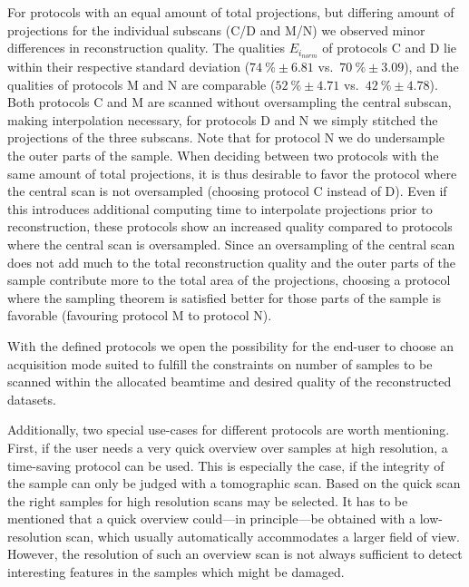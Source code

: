 For protocols with an equal amount of total projections, but differing amount of projections for the individual subscans (C/D and M/N) we observed minor differences in reconstruction quality. The qualities $E_{i_{norm}}$ of protocols C and D lie within their respective standard deviation ($\SI{74}{\percent}\pm6.81$ vs.\ $\SI{70}{\percent}\pm3.09$), and the qualities of protocols M and N are comparable ($\SI{52}{\percent}\pm4.71$ vs.\ $\SI{42}{\percent}\pm4.78$). Both protocols C and M are scanned without oversampling the central subscan, making interpolation necessary, for protocols D and N we simply stitched the projections of the three subscans. Note that for protocol N we do undersample the outer parts of the sample. When deciding between two protocols with the same amount of total projections, it is thus desirable to favor the protocol where the central scan is not oversampled (\ie choosing protocol C instead of D). Even if this introduces additional computing time to interpolate projections prior to reconstruction, these protocols show an increased quality compared to protocols where the central scan is oversampled. Since an oversampling of the central scan does not add much to the total reconstruction quality and the outer parts of the sample contribute more to the total area of the projections, choosing a protocol where the sampling theorem is satisfied better for those parts of the sample is favorable (\ie favouring protocol M to protocol N).

With the defined protocols we open the possibility for the end-user to choose an acquisition mode suited to fulfill the constraints on number of samples to be scanned within the allocated beamtime and desired quality of the reconstructed datasets.

Additionally, two special use-cases for different protocols are worth mentioning. First, if the user needs a very quick overview over samples at high resolution, a time-saving protocol can be used. This is especially the case, if the integrity of the sample can only be judged with a tomographic scan. Based on the quick scan the right samples for high resolution scans may be selected. It has to be mentioned that a quick overview could---in principle---be obtained with a low-resolution scan, which usually automatically accommodates a larger field of view. However, the resolution of such an overview scan is not always sufficient to detect interesting features in the samples which might be damaged.

